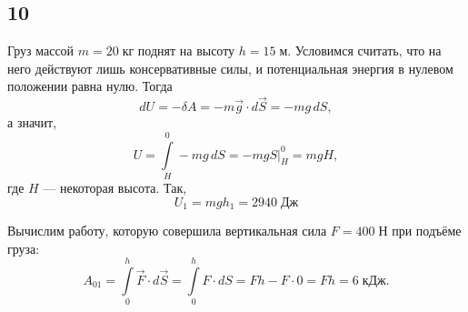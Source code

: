 \subsection{10}

Груз массой $m=20\;\text{кг}$ поднят на высоту $h=15\;\text{м}$. Условимся считать, что на него действуют лишь консервативные силы, и потенциальная энергия в нулевом положении равна нулю. Тогда
\[
dU=-\delta A=-m\vec g\cdot d\vec S=-mg\,dS,
\]
а значит,
\[
U=\int\limits^0_{H} -mg\,dS=\left.-mgS\right\vert^0_{H}=mgH,
\]
где $H$ --- некоторая высота. Так,
\[
U_1=mgh_1=2940\;\text{Дж}
\]

Вычислим работу, которую совершила вертикальная сила $F=400\;\text{Н}$ при подъёме груза:
\[
A_{01}=\int\limits_0^h\vec F\cdot d\vec S=\int\limits_0^h F\cdot dS=Fh-F\cdot0=Fh=6\;\text{кДж}.
\]